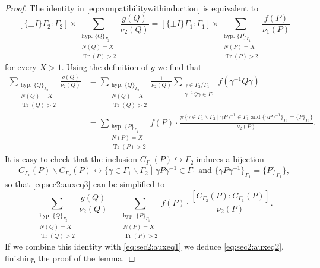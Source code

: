 \documentclass{article}
\theoremstyle{named}
\newcommand{\N}{\mathcal{N}}
\DeclareMathOperator{\Tr}{Tr}
\begin{document}
\begin{proof}
The identity in \eqref{eq:compatibilitywithinduction} is equivalent to
\begin{equation}\label{eq:sec2:auxeq2}
    [\{\pm I\}\Gamma_2: \Gamma_2]\times \sum_{\substack{\text{hyp. }\{Q\}_{\Gamma_2}\\N(Q) = X\\
    \Tr(P) > 2}} \frac{g(Q)}{\nu_2(Q)} = [\{\pm I\}\Gamma_1: \Gamma_1]\times\sum_{\substack{\text{hyp. }\{P\}_{\Gamma_1}\\
    N(P) = X\\
    \Tr(P) > 2}} \frac{f(P)}{\nu_1(P)}
\end{equation}
for every $X > 1$. Using the definition of $g$ we find that
\begin{equation}\label{eq:sec2:auxeq3}
\begin{aligned}
     \sum_{\substack{\text{hyp. }\{Q\}_{\Gamma_2}\\N(Q) = X\\
    \Tr(Q) > 2}} \frac{g(Q)}{\nu_2(Q)} & =  \sum_{\substack{\text{hyp. }\{Q\}_{\Gamma_2}\\N(Q) = X\\
    \Tr(Q) > 2}} \frac{1}{\nu_2(Q)} \sum_{\substack{\gamma \in \Gamma_2 /\Gamma_1\\ \gamma^{-1}Q\gamma \in \Gamma_1}}f(\gamma^{-1}Q\gamma)\\
    & = \sum_{\substack{\text{hyp. }\{P\}_{\Gamma_1}\\N(P) = X\\
    \Tr(P) > 2}} f(P) \cdot \frac{\#\{\gamma \in \Gamma_1 \backslash \Gamma_2 \mid \gamma P \gamma^{-1} \in \Gamma_1 \text{ and } \{\gamma P \gamma^{-1}\}_{\Gamma_1} = \{P\}_{\Gamma_1}\}}{\nu_2(P)}.
\end{aligned}
\end{equation}
It is easy to check that the inclusion $C_{\Gamma_2}(P) \hookrightarrow \Gamma_2$ induces a bijection
\begin{equation*}
    C_{\Gamma_1}(P) \backslash C_{\Gamma_2}(P) \longleftrightarrow \{\gamma \in \Gamma_1 \backslash \Gamma_2 \mid \gamma P \gamma^{-1} \in \Gamma_1 \text{ and } \{\gamma P \gamma^{-1}\}_{\Gamma_1} = \{P\}_{\Gamma_1}\},
\end{equation*}
so that \eqref{eq:sec2:auxeq3} can be simplified to
\begin{equation*}
    \sum_{\substack{\text{hyp. }\{Q\}_{\Gamma_2}\\N(Q) = X\\
    \Tr(Q) > 2}} \frac{g(Q)}{\nu_2(Q)} =\sum_{\substack{\text{hyp. }\{P\}_{\Gamma_1}\\N(P) = X\\
    \Tr(P) > 2}} f(P) \cdot \frac{[C_{\Gamma_2}(P): C_{\Gamma_1}(P)]}{\nu_2(P)}. 
\end{equation*}
If we combine this identity with \eqref{eq:sec2:auxeq1} we deduce \eqref{eq:sec2:auxeq2}, finishing the proof of the lemma.
\end{proof}
\end{document}
